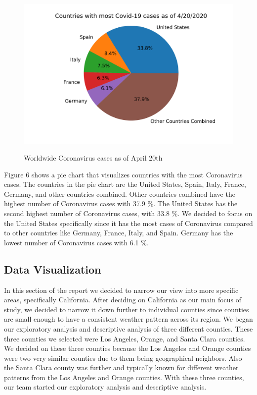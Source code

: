 \documentclass[10pt,journal,compsoc]{IEEEtran}
\begin{document}
{{\begin{figure}[!htbp] %
	\includegraphics[scale=0.4]{covid-us.png}\\ %
	\centering
	\caption{Worldwide Coronavirus cases as of April 20th}
	\label{LP-COVID-World}
\end{figure}

	Figure 6 shows a pie chart that visualizes countries with the most Coronavirus cases. The countries in the pie chart are the United States, Spain, Italy, France, Germany, and other countries combined. Other countries combined have the highest number of Coronavirus cases with 37.9 \%. The United States has the second highest number of Coronavirus cases, with 33.8 \%. We decided to focus on the United States specifically since it has the most cases of Coronavirus compared to other countries like Germany, France, Italy, and Spain. Germany has the lowest number of Coronavirus cases with 6.1 \%.


\subsection{Data Visualization}
\label{subsec:data visualization}

	In this section of the report we decided to narrow our view into more specific areas, specifically California. After deciding on California as our main focus of study, we decided to narrow it down further to individual counties since counties are small enough to have a consistent weather pattern across its region. We began our exploratory analysis and descriptive analysis of three different counties.\cite{NOAA-2020} \cite{MyrnaMFL-2020} These three counties we selected were Los Angeles, Orange, and Santa Clara counties. We decided on these three counties because the Los Angeles and Orange counties were two very similar counties due to them being geographical neighbors. Also the Santa Clara county was further and typically known for different weather patterns from the Los Angeles and Orange counties. With these three counties, our team started our exploratory analysis and descriptive analysis.

}}
\end{document}
